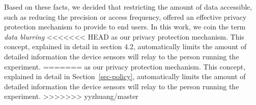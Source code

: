 {Based on these facts, we decided that restricting 
the amount of data accessible, such as reducing the precision or 
access frequency, offered an effective privacy protection mechanism to 
provide to end users. In this work, we coin the term \textit{data blurring}
<<<<<<< HEAD
as our privacy protection mechanism. This concept, explained in detail in section 4.2, automatically limits the amount of detailed information the device sensors will relay to the person running the experiment.
=======
as our privacy protection mechanism. This concept, explained in detail in
Section~\ref{sec-policy}, automatically limits the amount of detailed 
information the device sensors will relay to the person running the 
experiment.
>>>>>>> yyzhuang/master

}
